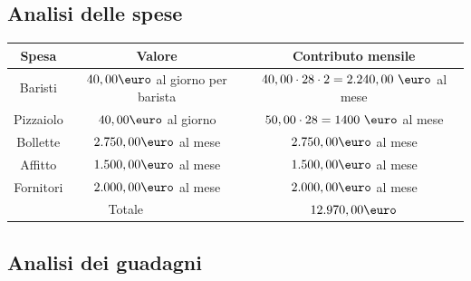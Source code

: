 \documentclass[a4paper, 12pt]{article}
\begin{document}
\subsection{Analisi delle spese}
\begin{table}[H]
\centering
\begin{tabular}{|c|c|c|}
\hline
\cellcolor{cellcolor}Spesa & \cellcolor{cellcolor}Valore & \cellcolor{cellcolor}Contributo mensile \\
\hline
\hline
Baristi & $40,00 \mbox{\euro}$ al giorno per barista & $40,00 \cdot 28 \cdot 2 = 2.240,00\ \mbox{\euro}$ al mese \\
\hline
Pizzaiolo & $40,00 \mbox{\euro}$ al giorno & $50,00 \cdot 28 = 1400\ \mbox{\euro}$  al mese\\
\hline
Bollette & $2.750,00 \mbox{\euro}$ al mese & $2.750,00 \mbox{\euro}$ al mese \\
\hline
Affitto & $1.500,00 \mbox{\euro}$ al mese & $1.500,00 \mbox{\euro}$ al mese\\
\hline
Fornitori & $2.000,00 \mbox{\euro}$ al mese & $2.000,00 \mbox{\euro}$ al mese\\
\hline
\hline
\multicolumn{2}{|c|}{Totale} & \cellcolor{red!40} $12.970,00 \mbox{\euro}$\\
\hline

\end{tabular}
\end{table}

\subsection{Analisi dei guadagni}
\end{document}
